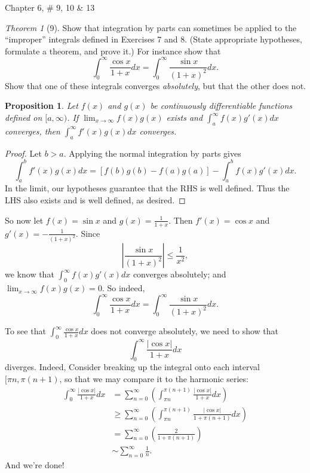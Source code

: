 \documentclass[12pt]{article}
\newtheorem*{prop}{Proposition}
\theoremstyle{remark}
\theoremstyle{named}
\newtheorem*{theorem}{Theorem}
\newcommand{\abs}[1]{|#1|}
\newcommand{\bigabs}[1]{\left|#1\right|}
\begin{document}
Chapter 6, \# 9, 10 \& 13

\begin{theorem}[9]
    Show that integration by parts can sometimes be applied to the ``improper'' integrals defined in Exercises 7 and 8. (State appropriate hypotheses, formulate a theorem, and prove it.) For instance show that 
    \[\int_0^\infty \frac{\cos x}{1 + x}dx = \int_0^\infty \frac{\sin x}{(1 + x)^2}dx.\]
    Show that one of these integrals converges \textit{absolutely}, but that the other does not.
\end{theorem}

\begin{prop}
    Let \(f(x)\) and \(g(x)\) be continuously differentiable functions defined on \([a,  \infty)\). If \(\lim_{x \to \infty} f(x)g(x)\) exists and \(\int_a^\infty f(x)g'(x)dx\) converges, then \(\int_a^\infty f'(x)g(x)dx\) converges. 
\end{prop}

\begin{proof}
    Let \(b > a\). Applying the normal integration by parts gives 
    \[\int_a^b f'(x)g(x) dx = [f(b)g(b) - f(a)g(a)] - \int_a^b f(x)g'(x) dx.\]
    In the limit, our hypotheses guarantee that the RHS is well defined. Thus the LHS also exists and is well defined, as desired.
\end{proof}

So now let \(f(x) = \sin x\) and \(g(x) = \frac{1}{1 + x}\). Then \(f'(x) = \cos x\) and \(g'(x) = -\frac{1}{(1 + x)^2}\). Since \[\bigabs{\frac{\sin x}{(1 + x)^2}}\le \frac{1}{x^2},\]
we know that \(\int_0^\infty f(x)g'(x)dx\) converges absolutely; and \(\lim_{x \to \infty} f(x)g(x) = 0\). So indeed, 
\[\int_0^\infty \frac{\cos x}{1 + x}dx = \int_0^\infty \frac{\sin x}{(1 + x)^2}dx.\]

To see that \(\int_0^\infty \frac{\cos x}{1 + x}dx\) does not converge absolutely, we need to show that 
\[\int_0^\infty \frac{\abs{\cos x}}{1 + x}dx\] diverges. Indeed, Consider breaking up the integral onto each interval \([\pi n, \pi (n + 1)\), so that we may compare it to the harmonic series:
\begin{align*}
    \int_0^\infty \frac{\abs{\cos x}}{1 + x}dx &= \sum_{n = 0}^\infty \left(\int_{\pi n}^{\pi (n + 1)} \frac{\abs{\cos x}}{1 + x}dx\right) \\
    &\ge \sum_{n = 0}^\infty \left(\int_{\pi n}^{\pi (n + 1)} \frac{\abs{\cos x}}{1 + \pi (n + 1)}dx\right) \\
    &= \sum_{n = 0}^\infty \left(\frac{2}{1 + \pi (n + 1)}\right) \\
    &\sim \sum_{n = 0}^\infty \frac 1 n.
\end{align*}
And we're done!
\end{document}
